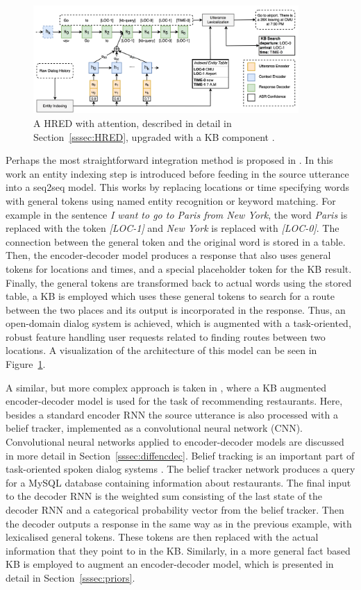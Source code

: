 \documentclass[12pt]{article}
\begin{document}
\begin{figure}[H]
	\centering
	\includegraphics[width=0.9\textwidth]{pics/KB.png}
	\caption{A HRED with attention, described in detail in Section~\ref{sssec:HRED}, upgraded with a KB component \cite{Zhao:2017}.}
	\label{fig:KB}
\end{figure}
Perhaps the most straightforward integration method is proposed in \cite{Zhao:2017}. In this work an entity indexing step is introduced before feeding in the source utterance into a seq2seq model. This works by replacing locations or time specifying words with general tokens using named entity recognition or keyword matching. For example in the sentence \textit{I want to go to Paris from New York}, the word \textit{Paris} is replaced with the token \textit{[LOC-1]} and \textit{New York} is replaced with \textit{[LOC-0]}. The connection between the general token and the original word is stored in a table.  Then, the encoder-decoder model produces a response that also uses general tokens for locations and times, and a special placeholder token for the KB result. Finally, the general tokens are transformed back to actual words using the stored table, a KB is employed which uses these general tokens to search for a route between the two places and its output is incorporated in the response. Thus, an open-domain dialog system is achieved, which is augmented with a task-oriented, robust feature handling user requests related to finding routes between two locations. A visualization of the architecture of this model can be seen in Figure~\ref{fig:KB}.

A similar, but more complex approach is taken in \cite{Wen:2016}, where a KB augmented encoder-decoder model is used for the task of recommending restaurants. Here, besides a standard encoder RNN the source utterance is also processed with a belief tracker, implemented as a convolutional neural network (CNN). Convolutional neural networks applied to encoder-decoder models are discussed in more detail in Section~\ref{sssec:diffencdec}. Belief tracking is an important part of task-oriented spoken dialog systems \cite{Henderson:2015}. The belief tracker network produces a query for a MySQL database containing information about restaurants. The final input to the decoder RNN is the weighted sum consisting of the last state of the decoder RNN and a categorical probability vector from the belief tracker. Then the decoder outputs a response in the same way as in the previous example, with lexicalised general tokens. These tokens are then replaced with the actual information that they point to in the KB. Similarly, in \cite{Ghazvininejad:2017} a more general fact based KB is employed to augment an encoder-decoder model, which is presented in detail in Section~\ref{sssec:priors}.
\end{document}
